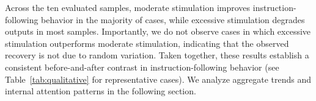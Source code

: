 Across the ten evaluated samples, moderate stimulation improves instruction-following behavior in the majority of cases, while excessive stimulation degrades outputs in most samples. Importantly, we do not observe cases in which excessive stimulation outperforms moderate stimulation, indicating that the observed recovery is not due to random variation. Taken together, these results establish a consistent before-and-after contrast in instruction-following behavior (see Table~\ref{tab:qualitative} for representative cases). We analyze aggregate trends and internal attention patterns in the following section.
